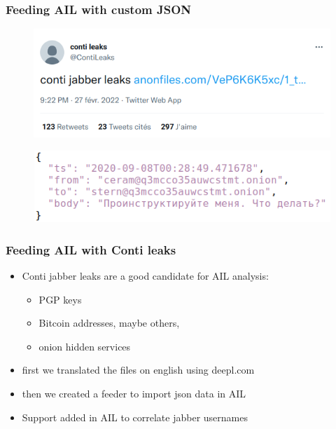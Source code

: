 \begin{frame}[fragile]
	\frametitle{Feeding AIL with custom JSON}
	\begin{figure}[t]
		\includegraphics[width=.8\textwidth]{screenshot/contileaks-twitter.png}
		\centering
	\end{figure}

	\begin{figure}[t]
		\includegraphics[width=.6\textwidth]{screenshot/contileaks-json.png}
		\centering
	\end{figure}

\end{frame}

\begin{frame}[fragile]                                                                                                                        

   \frametitle{Feeding AIL with Conti leaks}

        \begin{itemize}
		\item Conti jabber leaks are a good candidate for AIL analysis:
        	\begin{itemize}
			\item PGP keys
			\item Bitcoin addresses, maybe others,
			\item onion hidden services
        	\end{itemize}
        \item first we translated the files on english using deepl.com
		\item then we created a feeder to import json data in AIL
		\item Support added in AIL to correlate jabber usernames
        \end{itemize}

\end{frame}


